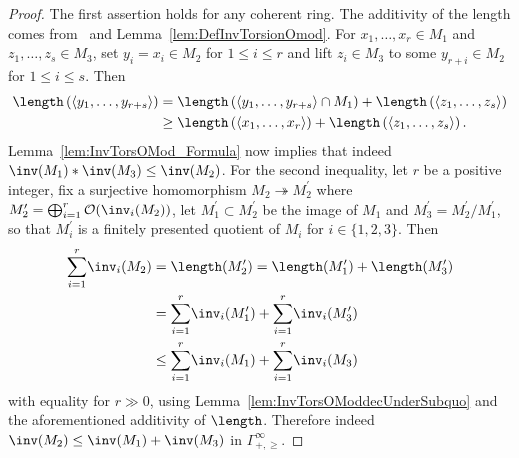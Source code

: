 \begin{proof}
The first assertion holds for any coherent ring. The additivity of the length comes from~\cite[6.3.1]{GaRa03} and Lemma~\ref{lem:DefInvTorsionOmod}. For $x_{1},\dots,x_{r}\in M_{1}$ and $z_{1},\dots,z_{s}\in M_{3}$, set $y_{i}=x_{i}\in M_{2}$ for $1\leq i\leq r$ and lift $z_{i}\in M_{3}$ to some $y_{r+i}\in M_{2}$ for $1\leq i\leq s$. Then
\begin{align*}
\length\left(\left\langle y_{1},\dots,y_{r+s}\right\rangle \right) & = \length\left(\left\langle y_{1},\dots,y_{r+s}\right\rangle \cap M_{1}\right)+\length\left(\left\langle z_{1},\dots,z_{s}\right\rangle \right)\\
& \geq \length\left(\left\langle x_{1},\dots,x_{r}\right\rangle \right)+\length\left(\left\langle z_{1},\dots,z_{s}\right\rangle \right).
\end{align*}
Lemma~\ref{lem:InvTorsOMod_Formula} now implies that indeed $\inv(M_{1})\ast\inv(M_{3})\leq\inv(M_{2})$. For the second inequality, let $r$ be a positive integer, fix a surjective homomorphism $M_{2}\twoheadrightarrow M_{2}^{\prime}$ where $M_{2}^{\prime}=\bigoplus_{i=1}^{r}\mathcal{O}(\inv_{i}(M_{2}))$, let $M_{1}^{\prime}\subset M_{2}^{\prime}$ be the image of $M_{1}$ and $M_{3}^{\prime}=M_{2}^{\prime}/M_{1}^{\prime}$, so that $M_{i}^{\prime}$ is a finitely presented quotient of $M_{i}$ for $i\in\{1,2,3\}$. Then
\begin{align*}
{\sum_{i=1}^{r}}\inv_{i}(M_{2}) & =\length(M_{2}^{\prime})=\length(M_{1}^{\prime})+\length(M_{3}^{\prime})\\
& ={\sum_{i=1}^{r}}\inv_{i}(M_{1}^{\prime})+{\sum_{i=1}^{r}}\inv_{i}(M_{3}^{\prime})\\
& \leq{\sum_{i=1}^{r}}\inv_{i}(M_{1})+{\sum_{i=1}^{r}}\inv_{i}(M_{3})
\end{align*}
with equality for $r\gg0$, using Lemma~\ref{lem:InvTorsOModdecUnderSubquo} and the aforementioned additivity of $\length$. Therefore indeed $\inv(M_{2})\leq\inv(M_{1})+\inv(M_{3})$ in $\Gamma_{+,\geq}^{\infty}$.


\end{proof}
